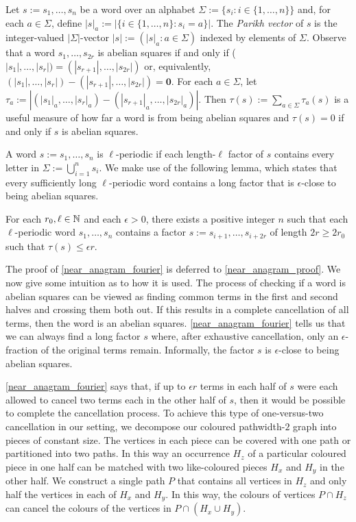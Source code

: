 \documentclass{patmorin}
\begin{document}
Let $s:=s_1,\ldots,s_n$ be a word over an alphabet $\Sigma:=\{s_i:i\in\{1,\ldots,n\}\}$ and, for each $a\in \Sigma$, define $|s|_a:=|\{i\in\{1,\ldots,n\}:s_i=a\}|$.  The \emph{Parikh vector} of $s$ is the integer-valued $|\Sigma|$-vector $|s|:=(|s|_a:a\in\Sigma)$ indexed by elements of $\Sigma$.  Observe that a word $s_1,\ldots,s_{2r}$ is abelian squares if and only if ($|s_1|,\ldots,|s_r|) = (|s_{r+1}|,\ldots,|s_{2r}|)$ or, equivalently, $(|s_1|,\ldots,|s_r|)-(|s_{r+1}|,\ldots,|s_{2r}|)=\boldsymbol{0}$.
For each $a\in\Sigma$, let $\tau_a:=|(|s_1|_a,\ldots,|s_r|_a)-(|s_{r+1}|_a,\ldots,|s_{2r}|_a)|$.
Then $\tau(s):=\sum_{a\in\Sigma}\tau_a(s)$ is a useful measure of how far a word is from being abelian squares and $\tau(s)=0$ if and only if $s$ is abelian squares.

A word $s:=s_1,\ldots,s_n$ is $\ell$-periodic if each length-$\ell$ factor of $s$ contains every letter in $\Sigma:=\bigcup_{i=1}^n s_i$.  We make use of the following lemma, which states that every sufficiently long $\ell$-periodic word contains a long factor that is $\epsilon$-close to being abelian squares.

\begin{lem}\label{near_anagram_fourier}
    For each $r_0,\ell\in\mathbb{N}$ and each $\epsilon>0$, there exists a positive integer $n$ such that each $\ell$-periodic word $s_1,\ldots,s_n$ contains a factor $s:=s_{i+1},\ldots,s_{i+2r}$ of length $2r \ge 2r_0$ such that $\tau(s)\le \epsilon r$.
\end{lem}

The proof of \cref{near_anagram_fourier} is deferred to \cref{near_anagram_proof}.  We now give some intuition as to how it is used.  The process of checking if a word is abelian squares can be viewed as finding common terms in the first and second halves and crossing them both out.  If this results in a complete cancellation of all terms, then the word is an abelian squares.  \cref{near_anagram_fourier} tells us that we can always find a long factor $s$ where, after exhaustive cancellation, only an $\epsilon$-fraction of the original terms remain.  Informally, the factor $s$ is $\epsilon$-close to being abelian squares.

\cref{near_anagram_fourier} says that, if up to $\epsilon r$ terms in each half of $s$ were each allowed to cancel two terms each in the other half of $s$, then it would be possible to complete the cancellation process.  To achieve this type of one-versus-two cancellation in our setting, we decompose our coloured pathwidth-$2$ graph into pieces of constant size.  The vertices in each piece can be covered with one path or partitioned into two paths.  In this way an occurrence $H_z$ of a particular coloured piece in one half can be matched with two like-coloured pieces $H_x$ and $H_y$ in the other half. We construct a single path $P$ that contains all vertices in $H_z$ and only half the vertices in each of $H_x$ and $H_y$.  In this way, the colours of vertices $P\cap H_z$ can cancel the colours of the vertices in $P\cap(H_x\cup H_y)$.
\end{document}

